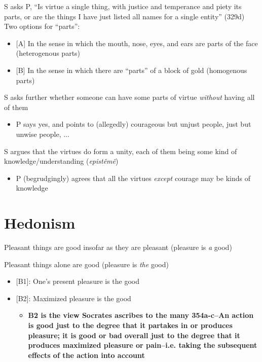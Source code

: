 \documentclass[11pt]{article}
\begin{document}
\noindent S asks P, ``Is virtue a single thing, with justice and temperance and piety its parts, or are the things I have just listed all names for a single entity'' (329d) Two options for ``parts'':
\vspace*{2mm}

\begin{itemize}\item{[A] In the sense in which the mouth, nose, eyes, and ears are parts of the face (heterogenous parts)}\item{[B] In the sense in which there are ``parts'' of a block of gold (homogenous parts)}\end{itemize}
\vspace*{2mm}

\noindent S asks further whether someone can have some parts of virtue \emph{without} having all of them
\begin{itemize}
\item{P says yes, and points to (allegedly) courageous but unjust people, just but unwise people, ...}\end{itemize}

\noindent S argues that the virtues do form a unity, each of them being some kind of knowledge/understanding (\emph{epist\^{e}m\^{e}})

\begin{itemize}\item{P (begrudgingly) agrees that all the virtues \emph{except} courage may be kinds of knowledge}\end{itemize}

\section*{Hedonism}

\noindent [A] Pleasant things are good insofar as they are pleasant (pleasure is \emph{a} good)
\vspace*{2mm}

\noindent [B] Pleasant things alone are good (pleasure is \emph{the} good)

\begin{itemize}\item{[B1]: One's present pleasure is the good}\item{[B2]: Maximized pleasure is the good}\begin{itemize}\item{\textbf{B2 is the view Socrates ascribes to the many 354a-c--An action is good just to the degree that it partakes in or produces pleasure; it is good or bad overall just to the degree that it produces maximized pleasure or pain--i.e. taking the subsequent effects of the action into account}}\end{itemize}\end{itemize}
\vspace*{2mm}
\end{document}
